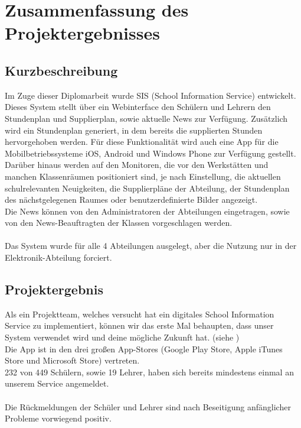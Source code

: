 \chapter[Zusammenfassung]{Zusammenfassung des Projektergebnisses}

\section{Kurzbeschreibung}
Im Zuge dieser Diplomarbeit wurde SIS (School Information Service) entwickelt. \\
Dieses System stellt über ein Webinterface den Schülern und Lehrern den Stundenplan und Supplierplan, sowie aktuelle News zur Verfügung. Zusätzlich wird ein Stundenplan generiert, in dem bereits die supplierten Stunden hervorgehoben werden.
Für diese Funktionalität wird auch eine App für die Mobilbetriebssysteme iOS, Android und Windows Phone zur Verfügung gestellt.\\
Darüber hinaus werden auf den Monitoren, die vor den Werkstätten und manchen Klassenräumen positioniert sind, je nach Einstellung, die aktuellen schulrelevanten Neuigkeiten, die Supplierpläne der Abteilung, der Stundenplan des nächstgelegenen Raumes oder benutzerdefinierte Bilder angezeigt.\\
Die News können von den Administratoren der Abteilungen eingetragen, sowie von den News-Beauftragten der Klassen vorgeschlagen werden.\\
\\
Das System wurde für alle 4 Abteilungen ausgelegt, aber die Nutzung nur in der Elektronik-Abteilung forciert.

\section{Projektergebnis}
Als ein Projektteam, welches versucht hat ein digitales School Information Service zu implementiert, können wir das erste Mal behaupten, dass unser System verwendet wird und deine mögliche Zukunft hat. (siehe )\\
Die App ist in den drei großen App-Stores (Google Play Store, Apple iTunes Store und Microsoft Store) vertreten.\\
232 von 449 Schülern, sowie 19 Lehrer, haben sich bereits mindestens einmal an unserem Service angemeldet. \\
\\
Die Rückmeldungen der Schüler und Lehrer sind nach Beseitigung anfänglicher Probleme vorwiegend positiv.

